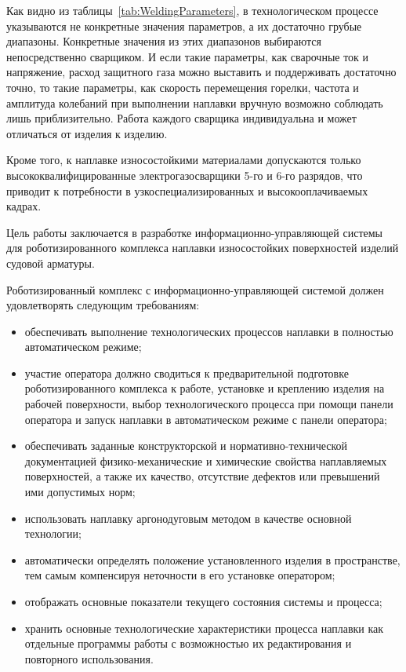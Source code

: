 Как видно из таблицы~\ref{tab:WeldingParameters}, в технологическом процессе указываются не конкретные значения параметров, а их достаточно грубые диапазоны.
Конкретные значения из этих диапазонов выбираются непосредственно сварщиком.
И если такие параметры, как сварочные ток и напряжение, расход защитного газа можно выставить и поддерживать достаточно точно, то такие параметры, как скорость перемещения горелки, частота и амплитуда колебаний при выполнении наплавки вручную возможно соблюдать лишь приблизительно.
Работа каждого сварщика индивидуальна и может отличаться от изделия к изделию.

Кроме того, к наплавке износостойкими материалами допускаются только высококвалифицированные электрогазосварщики 5-го и 6-го разрядов, что приводит к потребности в узкоспециализированных и высокооплачиваемых кадрах.

Цель работы заключается в разработке информационно-управляющей системы для роботизированного комплекса наплавки износостойких поверхностей изделий судовой арматуры.

Роботизированный комплекс с информационно-управляющей системой должен удовлетворять следующим требованиям:

\begin{itemize}
	\item обеспечивать выполнение технологических процессов наплавки в полностью автоматическом режиме;
	\item участие оператора должно сводиться к предварительной подготовке роботизированного комплекса к работе, установке и креплению изделия на рабочей поверхности, выбор технологического процесса при помощи панели оператора и запуск наплавки в автоматическом режиме с панели оператора;
	\item обеспечивать заданные конструкторской и нормативно-технической документацией физико-механические и химические свойства наплавляемых поверхностей, а также их качество, отсутствие дефектов или превышений ими допустимых норм;
	\item использовать наплавку аргонодуговым методом в качестве основной технологии;
	\item автоматически определять положение установленного изделия в пространстве, тем самым компенсируя неточности в его установке оператором;
	\item отображать основные показатели текущего состояния системы и процесса;
	\item хранить основные технологические характеристики процесса наплавки как отдельные программы работы с возможностью их редактирования и повторного использования.
\end{itemize}

